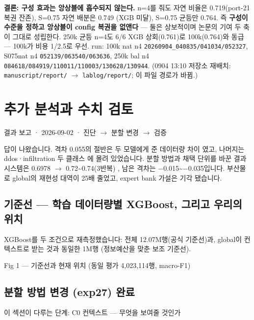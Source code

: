\textbf{결론: 구성 효과는 앙상블에 흡수되지 않는다.} n=\allowbreak{}4를 줘도 자연 비율은 0.719(port-21 복권 잔존), S=\allowbreak{}0.75 자연 배분은 0.749 (XGB 미달), S=\allowbreak{}0.75 균등만 0.764. 즉 \textbf{구성이 수준을 정하고 앙상블이 config 복권을 없앤다} — 둘은 상보적이며 논문의 기여 두 축이 그대로 성립한다. 250k 균등 n=\allowbreak{}4도 6/\allowbreak{}6 XGB 상회(0.761)로 100k(0.764)와 동급 — 100k가 비용 1/\allowbreak{}2.5로 우선. run: 100k nat n4 \texttt{20260904\allowbreak{}\_\allowbreak{}\allowbreak{}040835/\allowbreak{}\allowbreak{}041034/\allowbreak{}\allowbreak{}0\allowbreak{}52327}, S075nat n4 \texttt{052139/\allowbreak{}\allowbreak{}0\allowbreak{}63540/\allowbreak{}\allowbreak{}06\allowbreak{}3636}, 250k bal n4 \texttt{084618/\allowbreak{}\allowbreak{}0\allowbreak{}84919/\allowbreak{}\allowbreak{}11\allowbreak{}0011/\allowbreak{}\allowbreak{}110\allowbreak{}003/\allowbreak{}\allowbreak{}1306\allowbreak{}28/\allowbreak{}\allowbreak{}13094\allowbreak{}4}. (0904 13:10 저장소 재배치: \texttt{manuscri\allowbreak{}pt/\allowbreak{}\allowbreak{}repor\allowbreak{}t/\allowbreak{}\allowbreak{}}  \ensuremath{\rightarrow}  \texttt{lablog/\allowbreak{}\allowbreak{}r\allowbreak{}eport/\allowbreak{}\allowbreak{}}; 이 파일 경로가 바뀜.)



\section{추가 분석과 수치 검토}
결과 보고 · 2026-09-02 · 진단 \ensuremath{\rightarrow} 분할 변경 \ensuremath{\rightarrow} 검증

답이 나왔습니다. 격차 0.055의 절반은 두 모델에게 준 데이터량 차이 였고, 나머지는 ddos·infiltration 두 클래스 에 몰려 있었습니다. 분할 방법과 채택 단위를 바꾼 결과 시스템은 0.6978  \ensuremath{\rightarrow}  0.72\textasciitilde{}0.74(3반복) , 남은 격차는 −0.015\textasciitilde{}−0.035입니다. 부산물로 global의 재현성 대역이 25배 줄었고, expert bank 가설은 기각 됐습니다.

\subsection*{기준선 — 학습 데이터량별 XGBoost, 그리고 우리의 위치}
XGBoost를 두 조건으로 재측정했습니다: 전체 12.07M행(공식 기준선)과, global이 컨텍스트로 받는 것과 동일한 1M행 (정보예산을 맞춘 보조 기준선).

Fig 1 — 기준선과 현재 위치 (동일 평가 4,023,114행, macro-F1)

\subsection*{분할 방법 변경 (exp27) 완료}
이 섹션이 다루는 단계: C0 컨텍스트 — 무엇을 보여줄 것인가

